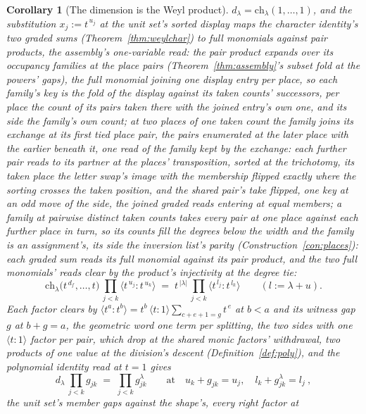 \documentclass[11pt]{article}
\newtheorem{corollary}{Corollary}
\theoremstyle{definition}
\begin{document}
\begin{corollary}[The dimension is the Weyl product]\label{cor:weyldim}
$d_\lambda=\mathrm{ch}_\lambda(1,\dots,1)$, and the substitution
$x_j:=t^{\,u_j}$ at the unit set's sorted display maps the
character identity's two graded sums
(Theorem~\ref{thm:weylchar}) to full monomials against pair
products, the assembly's one-variable read: the pair product
expands over its occupancy families at the place pairs
(Theorem~\ref{thm:assembly}'s subset fold at the powers' gaps),
the full monomial joining one display entry per place, so each
family's key is the fold of the display against its \emph{taken
counts}' successors, per place the count of its pairs taken
there with the joined entry's own one, and its side the family's
own count; at two places of one taken count the family joins its
exchange at its first tied place pair, the pairs enumerated at
the later place with the earlier beneath it, one read of the
family kept by the exchange: each further pair reads to its
partner at the places' transposition, sorted at the trichotomy,
its taken place the letter swap's image with the membership
flipped exactly where the sorting crosses the taken position,
and the shared pair's take flipped, one key at an odd move of
the side, the joined graded reads entering at equal members; a
family at
pairwise distinct taken counts takes every pair at one place
against each further place in turn, so its counts fill the
degrees below the width and the family is an assignment's, its
side the inversion list's parity (Construction~\ref{con:places}):
each graded sum reads its full monomial against its pair product,
and the two full monomials' reads clear
by the product's injectivity at the degree tie:
\[
\mathrm{ch}_\lambda\big(t^{\,d_f},\dots,t\big)\,
\prod_{j<k}\big\langle t^{\,u_j}\!:\!t^{\,u_k}\big\rangle
\;=\;t^{\,|\lambda|}\,\prod_{j<k}\big\langle t^{\,l_j}\!:\!t^{\,l_k}\big\rangle
\qquad(l:=\lambda+u) .
\]
Each factor clears by
$\langle t^{a}\!:\!t^{b}\rangle=t^{b}\,\langle t\!:\!1\rangle
\sum_{c+e+1=g}t^{\,e}$ at $b<a$ and its witness gap $g$ at $b+g=a$,
the geometric word
one term per splitting, the two sides with one
$\langle t\!:\!1\rangle$ factor per pair, which drop at the shared
monic factors' withdrawal, two products of one value at the
division's descent (Definition~\ref{def:poly}), and the polynomial
identity read at $t=1$ gives
\[
d_\lambda\,\prod_{j<k}g_{jk}\;=\;\prod_{j<k}g^{\lambda}_{jk}
\qquad\text{at}\quad
u_k+g_{jk}=u_j,\quad l_k+g^{\lambda}_{jk}=l_j\ ,
\]
the unit set's member gaps against the shape's, every right factor at

\end{corollary}
\end{document}
